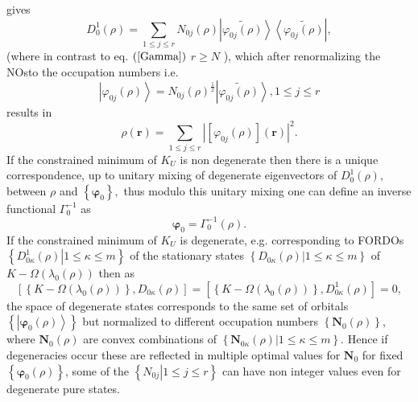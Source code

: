 \documentclass[aps,preprint]{revtex4}%
\begin{document}
gives
\begin{equation}
D_{0}^{1}\left(  \rho\right)  =\sum_{1\leq j\leq r}N_{0j}\left(  \rho\right)
\left\vert \widetilde{\varphi_{0j}\left(  \rho\right)  }\right\rangle
\left\langle \widetilde{\varphi_{0j}\left(  \rho\right)  }\right\vert ,
\end{equation}
(where in contrast to eq. $\left(  \ref{Gamma}\right)  $ $r\geq N$ ), which
after renormalizing the NOsto the occupation numbers i.e.
\begin{equation}
\left\vert \varphi_{0j}\left(  \rho\right)  \right\rangle =N_{0j}\left(
\rho\right)  ^{\frac{1}{2}}\left\vert \widetilde{\varphi_{0j}\left(
\rho\right)  }\right\rangle ,1\leq j\leq r
\end{equation}
results in
\begin{equation}
\rho\left(  \boldsymbol{r}\right)  =\sum_{1\leq j\leq r}\left\vert \left[
\varphi_{0j}\left(  \rho\right)  \right]  \left(  \boldsymbol{r}\right)
\right\vert ^{2}. \label{gammaKS}%
\end{equation}
If the constrained minimum of $K_{U}$ is non degenerate then there is a unique
correspondence, up to unitary mixing of degenerate eigenvectors of $D_{0}%
^{1}\left(  \rho\right)  ,$ between $\rho$ and $\left\{  \boldsymbol{\varphi
}_{0}\right\}  ,$ thus modulo this unitary mixing one can define an inverse
functional $\Gamma_{0}^{-1}$ as
\begin{equation}
\boldsymbol{\varphi}_{0}=\Gamma_{0}^{-1}\left(  \rho\right)  .
\end{equation}
If the constrained minimum of $K_{U}$ is degenerate, e.g. corresponding to
FORDOs$\left\{  \left.  D_{0\kappa}^{1}\left(  \rho\right)  \right\vert
1\leq\kappa\leq m\right\}  $ of the stationary states $\left\{  \left.
D_{0\kappa}\left(  \rho\right)  \right\vert 1\leq\kappa\leq m\right\}  $ of
$K-\Omega\left(  \lambda_{0}\left(  \rho\right)  \right)  $ then as
\begin{equation}
\left[  \left\{  K-\Omega\left(  \lambda_{0}\left(  \rho\right)  \right)
\right\}  ,D_{0\kappa}\left(  \rho\right)  \right]  =\left[  \left\{
K-\Omega\left(  \lambda_{0}\left(  \rho\right)  \right)  \right\}
,D_{0\kappa}^{1}\left(  \rho\right)  \right]  =0,
\end{equation}
the space of degenerate states corresponds to the same set of orbitals
$\left\{  \left\vert \boldsymbol{\varphi}_{0}\left(  \rho\right)
\right\rangle \right\}  $ but normalized to different occupation numbers
$\left\{  \boldsymbol{N}_{0}\left(  \rho\right)  \right\}  ,$ where
$\boldsymbol{N}_{0}\left(  \rho\right)  $ are convex combinations of $\left\{
\left.  \boldsymbol{N}_{0\kappa}\left(  \rho\right)  \right\vert 1\leq
\kappa\leq m\right\}  $. Hence if degeneracies occur these are reflected in
multiple optimal values for $\boldsymbol{\boldsymbol{N}}_{0}$ for fixed
$\left\{  \boldsymbol{\varphi}_{0}\left(  \rho\right)  \right\}  $, some of
the $\left\{  \left.  N_{0j}\right\vert 1\leq j\leq r\right\}  $ can have non
integer values even for degenerate pure states$\boldsymbol{.}$
\end{document}
